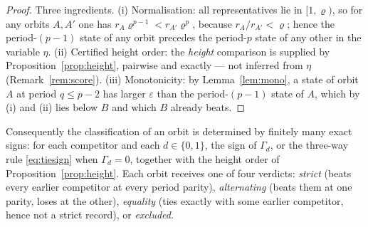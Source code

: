 \documentclass[11pt]{article}
\theoremstyle{definition}
\theoremstyle{remark}
\newcommand{\pr}{\varrho}
\newcommand{\gam}{\Gamma}
\begin{document}
\begin{proof}
Three ingredients. (i) Normalisation: all representatives lie in $[1,\pr)$, so for any orbits
$A,A'$ one has $r_A\pr^{p-1}<r_{A'}\pr^{p}$, because $r_A/r_{A'}<\pr$; hence the period-$(p-1)$
state of any orbit precedes the period-$p$ state of any other in the variable $\eta$.
(ii) Certified height order: the \emph{height} comparison is supplied by
Proposition~\ref{prop:height}, pairwise and exactly --- not inferred from $\eta$
(Remark~\ref{rem:score}). (iii) Monotonicity: by Lemma~\ref{lem:mono}, a state of orbit $A$ at
period $q\le p-2$ has larger $\varepsilon$ than the period-$(p-1)$ state of $A$, which by (i)
and (ii) lies below $B$ and which $B$ already beats.
\end{proof}

Consequently the classification of an orbit is determined by finitely many exact signs: for each
competitor and each $d\in\{0,1\}$, the sign of $\gam_d$, or the three-way rule
\eqref{eq:tiesign} when $\gam_d=0$, together with the height order of
Proposition~\ref{prop:height}. Each orbit receives one of four verdicts:
\emph{strict} (beats every earlier competitor at every period parity), \emph{alternating}
(beats them at one parity, loses at the other), \emph{equality} (ties exactly with some earlier
competitor, hence not a strict record), or \emph{excluded}.
\end{document}
